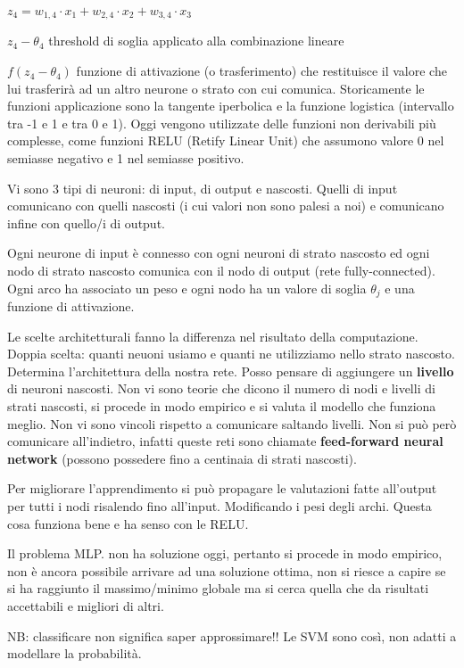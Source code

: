 $z_4 = w_{1,4} \cdot x_1 + w_{2,4} \cdot x_2 +w_{3,4} \cdot x_3$

$z_4 - \theta_4$ threshold di soglia applicato alla combinazione lineare

$f(z_4 - \theta_4)$ funzione di attivazione (o trasferimento) che restituisce il valore che lui trasferir\`a ad un altro neurone o strato con cui comunica. Storicamente le funzioni applicazione sono la tangente iperbolica e la funzione logistica (intervallo tra -1 e 1 e tra 0 e 1). Oggi vengono utilizzate delle funzioni non derivabili pi\`u complesse, come funzioni RELU (Retify Linear Unit) che assumono valore 0 nel semiasse negativo e 1 nel semiasse positivo.

Vi sono 3 tipi di neuroni: di input, di output e nascosti. Quelli di input comunicano con quelli nascosti (i cui valori non sono palesi a noi) e comunicano infine con quello/i di output. 

Ogni neurone di input \`e connesso con ogni neuroni di strato nascosto  ed ogni nodo di strato nascosto comunica con il nodo di output (rete fully-connected). Ogni arco ha associato un peso e ogni nodo ha un valore di soglia $\theta_j$ e una funzione di attivazione. 

Le scelte architetturali fanno la differenza nel risultato della computazione. Doppia scelta: quanti neuoni usiamo e quanti ne utilizziamo nello strato nascosto. Determina l'architettura della nostra rete. Posso pensare di aggiungere un \textbf{livello} di neuroni nascosti. Non vi sono teorie che dicono il numero di nodi e livelli di strati nascosti, si procede in modo empirico e si valuta il modello che funziona meglio. Non vi sono vincoli rispetto a comunicare saltando livelli. Non si pu\`o per\`o comunicare all'indietro, infatti queste reti sono chiamate \textbf{feed-forward neural network} (possono possedere fino a centinaia di strati nascosti).

Per migliorare l'apprendimento si pu\`o propagare le valutazioni fatte all'output per tutti i nodi risalendo fino all'input. Modificando i pesi degli archi. Questa cosa funziona bene e ha senso con le RELU.

Il problema MLP. non ha soluzione oggi, pertanto si procede in modo empirico, non \`e ancora possibile arrivare ad una soluzione ottima, non si riesce a capire se si ha raggiunto il massimo/minimo globale ma si cerca quella che da risultati accettabili e migliori di altri. 

NB: classificare non significa saper approssimare!! Le SVM sono cos\`i, non adatti a modellare la probabilit\`a.

